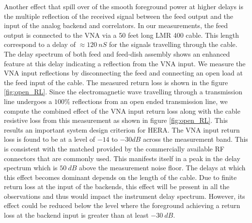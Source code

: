 \documentclass[twocolumn]{emulateapj}
\begin{document}
    Another effect that spill over of the smooth foreground power at higher delays
    is the multiple reflection of the received signal between the feed output and
    the input of the analog backend and correlators. In our measurements, the feed
    output is connected to the VNA via a 50 feet long LMR 400 cable. This length
    correspond to a delay of $\approx 120~nS$ for the signals travelling through
    the cable. The delay spectrum of both feed and feed-dish assembly shows an
    enhanced feature at this delay indicating a reflection from the VNA input. We
    measure the VNA input reflections by disconnecting the feed and connecting an
    open load at the feed input of the cable. The measured return loss is shown in
    the figure \ref{fig:open_RL}. Since the electromagnetic wave travelling through
    a transmission line undergoes a $100\%$ reflections from an open ended
    transmission line, we compute the combined effect of the VNA input return loss
    along with the cable resistive loss from this measurement as shown in figure
    \ref{fig:open_RL}. This results an important system design criterion for HERA.
    The VNA input return loss is found to be at a level of $-14$ to $-30dB$ across
    the measurement band. This is consistent with the matched provided by the
    commercially available RF connectors that are commonly used. This manifests
    itself in a peak in the delay spectrum which is $50~dB$ above the measurement
    noise floor. The delays at which this effect becomes dominant depends on the
    length of the cable. Due to finite return loss at the input of the backends,
    this effect will be present in all the observations and thus would impact the
    instrument delay spectrum. However, its effect could be reduced below the level
    where the foreground  achieving a return loss at the backend input is greater
    than at least $-30~dB$. 
    
\end{document}
